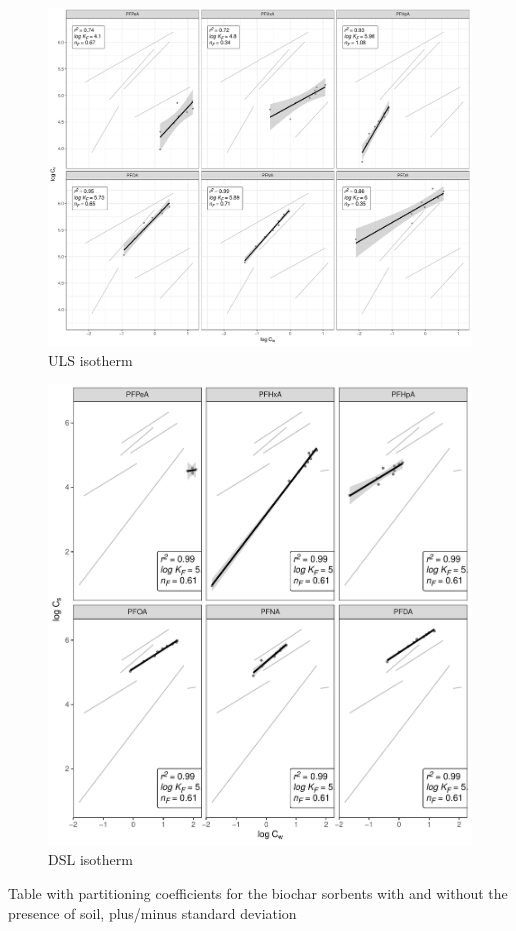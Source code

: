 \begin{figure}
    \centering
    \includegraphics[width=\textwidth]{R/figs/ULS_facet_isotherm.pdf}
    \caption{ULS isotherm}
    \label{fig:ULS_isotherm}
\end{figure}

\begin{figure}
    \centering
    \includegraphics[width=\textwidth]{R/figs/DSL_facet_isotherm.pdf}
    \caption{DSL isotherm}
    \label{fig:DSL_isotherm}
\end{figure}
Table with partitioning coefficients for the biochar sorbents with and without the presence of soil, plus/minus standard deviation
